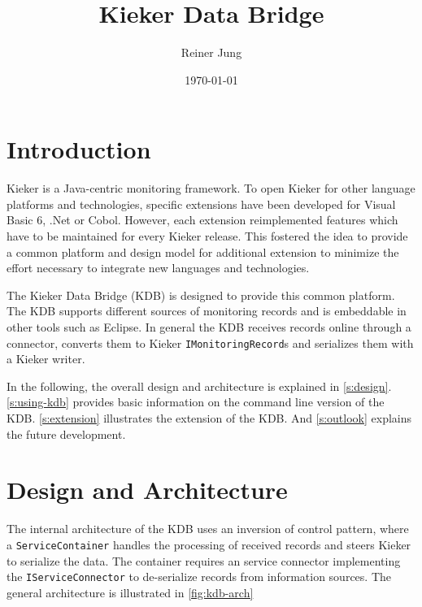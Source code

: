 \documentclass[11pt,a4paper]{article}
\title{Kieker Data Bridge}
\author{Reiner Jung}
\date{\today}
\begin{document}
\maketitle

\tableofcontents

\section{Introduction}  

Kieker is a Java-centric monitoring framework. To open Kieker for other language platforms and technologies, specific extensions have been developed for Visual Basic 6, .Net or Cobol. However, each extension reimplemented features which have to be maintained for every Kieker release. This fostered the idea to provide a common platform and design model for additional extension to minimize the effort necessary to integrate new languages and technologies.

The Kieker Data Bridge (KDB) is designed to provide this common platform. The KDB supports different sources of monitoring records and is embeddable in other tools such as Eclipse. In general the KDB receives records online through a connector, converts them to Kieker \texttt{IMonitoringRecord}s and serializes them with a Kieker writer.

In the following, the overall design and architecture is explained in \autoref{s:design}. \autoref{s:using-kdb} provides basic information on the command line version of the KDB. \autoref{s:extension} illustrates the extension of the KDB. And \autoref{s:outlook} explains the future development.

\section{Design and Architecture}\label{s:design}

The internal architecture of the KDB uses an inversion of control pattern, where a \texttt{ServiceContainer} handles the processing of received records and steers Kieker to serialize the data. The container requires an service connector implementing the \texttt{IServiceConnector} to de-serialize records from information sources. The general architecture is illustrated in \autoref{fig:kdb-arch}
\end{document}
